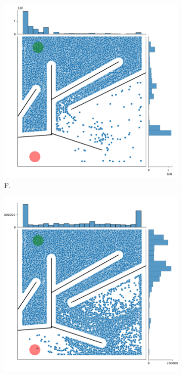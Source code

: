\begin{figure}[H]
    \begin{mdframed}
        \begin{subfigure}[b]{0.45\textwidth}
            \includegraphics[scale=0.3]{resources/mazes/pure_fitness_open.png}
            \caption{F.}
        \end{subfigure}
        \begin{subfigure}[b]{0.5\textwidth}
            \includegraphics[scale=0.3]{resources/mazes/pure_novelty_open.png}

\end{subfigure}
\end{mdframed}
\end{figure}

